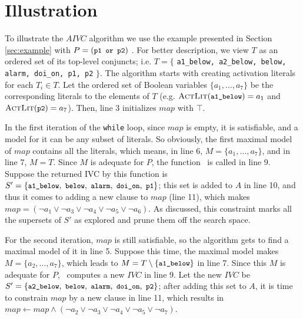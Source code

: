 \section{Illustration}
\label{sec:illust}
To illustrate the $AIVC$ algorithm we use the example presented in Section \ref{sec:example} with $P = (\small{\texttt{p1 or p2}})$ .
For better description, we view $T$ as an ordered set of its top-level conjuncts; i.e. $T = \{$ {\small \texttt{a1\_below, a2\_below, below, alarm, doi\_on, p1, p2}} $\}$.
The algorithm starts with creating activation literals for each $T_i \in T$. Let the ordered set of Boolean variables $\{ a_1, \ldots , a_7 \}$ be the corresponding literals to the elements of $T$ (e.g. $\actlit (\small{\texttt{a1\_below}}) = a_1$ and $\actlit (\small{\texttt{p2}}) = a_7$). Then, line 3 initializes $map$ with $\top$.

In the first iteration of the \texttt{while} loop, since $map$ is empty,
it is satisfiable, and a model for it can
be any subset of literals. So obviously, the first maximal model of $map$ contains all the literals, which means, in line 6, $M = \{a_1, \ldots, a_7\}$,
 and in line 7, $M = T$. Since $M$ is adequate for $P$,
 the function \getivc ~is called in line 9.
 Suppose the returned IVC by this function  is
 $S' = \{ \small{ \texttt{a1\_below},~\texttt{below}, ~\texttt{alarm},
~\texttt{doi\_on},~\texttt{p1}}\}$;
this set is added to $A$ in line 10, and thus it comes to adding a new clause to $map$ (line 11), which makes $map = (\neg a_1 \vee \neg a_3 \vee \neg a_4 \vee \neg a_5 \vee \neg a_6)$.
As discussed, this constraint marks all the supersets of $S'$ as explored and prune them off the search space.

For the second iteration, $map$ is still satisfiable,
so the algorithm gets to find a maximal model of it in line 5. Suppose this time, the maximal model makes $M = \{a_2, \ldots, a_7\}$,
which leads to $M = T \setminus \{\small{\texttt{a1\_below}}\} $ in line 7.
Since this $M$ is adequate for $P$, \getivc ~computes a new $IVC$ in line 9.
Let the new $IVC$ be $S' = \{ \small{ \texttt{a2\_below},~\texttt{below}, ~\texttt{alarm},
~\texttt{doi\_on},~\texttt{p2}}\}$; after adding this set to $A$,
it is time to constrain $map$ by a new clause in line 11,
which results in $map \leftarrow map \wedge (\neg a_2 \vee \neg a_3 \vee \neg a_4 \vee \neg a_5 \vee \neg a_7)$.

